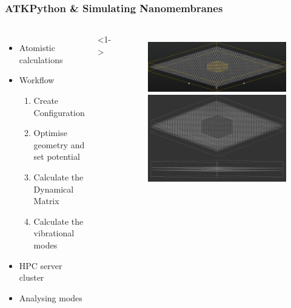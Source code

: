 \documentclass[hyperref={colorlinks=true,urlcolor=blue,linkcolor=.},aspectratio=1610,mathserif]{beamer}
\begin{document}
\begin{frame}
 \frametitle{ATKPython \& Simulating Nanomembranes}
 \begin{columns}[T]
  \begin{itemize}
   \item<1-> Atomistic calculations
   \item<2-> Workflow
         \begin{enumerate}
          \item<3-> Create Configuration
          \item<4-> Optimise geometry and set potential
          \item<5-> Calculate the Dynamical Matrix
          \item<6-> Calculate the vibrational modes
         \end{enumerate}
   \item<7-> HPC server cluster
   \item<8-> Analysing modes
  \end{itemize}
  <1->
  \begin{figure}
   \centering
   \includegraphics[width=\columnwidth]{Figures/NanoLayer5nm.png}
   \vspace{1em}
   \centering
   \includegraphics[width=\columnwidth]{Figures/DoubleMembrane.png}
  \end{figure}
 \end{columns}
\end{frame}
\end{document}
